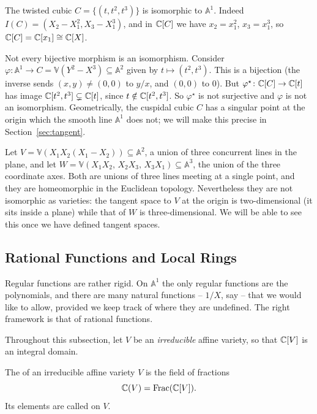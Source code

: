 \documentclass[a4paper]{scrartcl}
\newcommand{\A}{\mathbb{A}}
\newcommand{\V}{\mathbb{V}}
\newcommand{\Frac}{\operatorname{Frac}}
\begin{document}
\begin{example}
	The twisted cubic $C = \{(t,t^2,t^3)\}$ is isomorphic to $\A^1$. Indeed $I(C) = (X_2 - X_1^2, X_3 - X_1^3)$, and in $\mathbb{C}[C]$ we have $x_2 = x_1^2$, $x_3 = x_1^3$, so $\mathbb{C}[C] = \mathbb{C}[x_1] \cong \mathbb{C}[X]$.
\end{example}

\begin{example}
	Not every bijective morphism is an isomorphism. Consider $\varphi \colon \A^1 \to C = \V(Y^2 - X^3) \subseteq \A^2$ given by $t \mapsto (t^2,t^3)$. This is a bijection (the inverse sends $(x,y) \neq (0,0)$ to $y/x$, and $(0,0)$ to $0$). But $\varphi^\star \colon \mathbb{C}[C] \to \mathbb{C}[t]$ has image $\mathbb{C}[t^2,t^3] \subsetneq \mathbb{C}[t]$, since $t \notin \mathbb{C}[t^2,t^3]$. So $\varphi^\star$ is not surjective and $\varphi$ is not an isomorphism. Geometrically, the cuspidal cubic $C$ has a singular point at the origin which the smooth line $\A^1$ does not; we will make this precise in Section~\ref{sec:tangent}.
\end{example}

\begin{example}\label{ex:threelines}
	Let $V = \V(X_1X_2(X_1-X_2)) \subseteq \A^2$, a union of three concurrent lines in the plane, and let $W = \V(X_1X_2,\, X_2X_3,\, X_3X_1) \subseteq \A^3$, the union of the three coordinate axes. Both are unions of three lines meeting at a single point, and they are homeomorphic in the Euclidean topology. Nevertheless they are not isomorphic as varieties: the tangent space to $V$ at the origin is two-dimensional (it sits inside a plane) while that of $W$ is three-dimensional. We will be able to see this once we have defined tangent spaces.
\end{example}

\subsection{Rational Functions and Local Rings}

Regular functions are rather rigid. On $\A^1$ the only regular functions are the polynomials, and there are many natural functions -- $1/X$, say -- that we would like to allow, provided we keep track of where they are undefined. The right framework is that of rational functions.

Throughout this subsection, let $V$ be an \emph{irreducible} affine variety, so that $\mathbb{C}[V]$ is an integral domain.

\begin{definition}
	The  of an irreducible affine variety $V$ is the field of fractions
	$$\C(V) = \Frac(\C[V]).$$
	Its elements are called  on $V$.
\end{definition}
\end{document}
